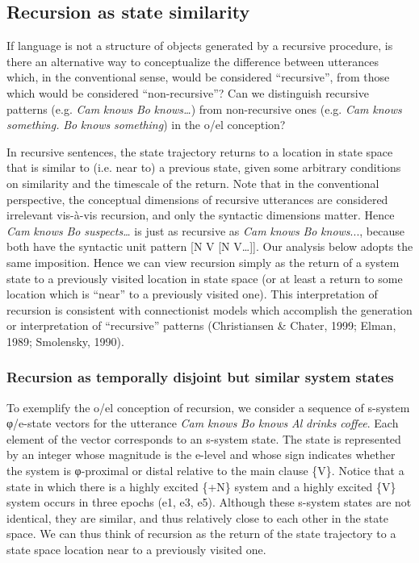 \subsection{Recursion as state similarity}

If language is not a structure of objects generated by a recursive procedure, is there an alternative way to conceptualize the difference between utterances which, in the conventional sense, would be considered “recursive”, from those which would be considered “non-recursive”? Can we distinguish recursive patterns (e.g. \textit{Cam} \textit{knows} \textit{Bo} \textit{knows…}) from non-recursive ones (e.g. \textit{Cam} \textit{knows} \textit{something.} \textit{Bo} \textit{knows} \textit{something}) in the o/el conception? 

  In recursive sentences, the state trajectory returns to a location in state space that is similar to (i.e. near to) a previous state, given some arbitrary conditions on similarity and the timescale of the return. Note that in the conventional perspective, the conceptual dimensions of recursive utterances are considered irrelevant vis-à-vis recursion, and only the syntactic dimensions matter. Hence \textit{Cam} \textit{knows} \textit{Bo} \textit{suspects…} is just as recursive as \textit{Cam} \textit{knows} \textit{Bo} \textit{knows}..., because both have the syntactic unit pattern [N V [N V…]]. Our analysis below adopts the same imposition. Hence we can view recursion simply as the return of a system state to a previously visited location in state space (or at least a return to some location which is “near” to a previously visited one). This interpretation of recursion is consistent with connectionist models which accomplish the generation or interpretation of “recursive” patterns (Christiansen \& Chater, 1999; Elman, 1989; Smolensky, 1990).

\subsubsection{Recursion as temporally disjoint but similar system states}

To exemplify the o/el conception of recursion, we consider a sequence of s-system φ/e-state vectors for the utterance \textit{Cam} \textit{knows} \textit{Bo} \textit{knows} \textit{Al} \textit{drinks} \textit{coffee}. Each element of the vector corresponds to an s-system state. The state is represented by an integer whose magnitude is the e-level and whose sign indicates whether the system is φ-proximal or distal relative to the main clause \{V\}. Notice that a state in which there is a highly excited \{+N\} system and a highly excited \{V\} system occurs in three epochs (e1, e3, e5). Although these s-system states are not identical, they are similar, and thus relatively close to each other in the state space. We can thus think of recursion as the return of the state trajectory to a state space location near to a previously visited one.

